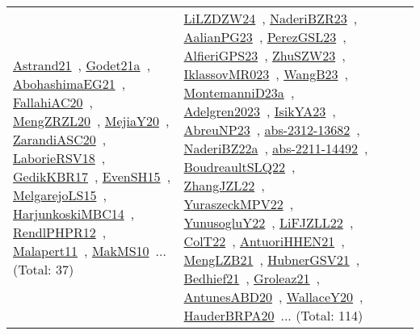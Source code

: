 {\begin{longtable}{lp{3cm}>{\raggedright\arraybackslash}p{6cm}>{\raggedright\arraybackslash}p{6cm}>{\raggedright\arraybackslash}p{8cm}}
\href{../works/Astrand21.pdf}{Astrand21}~\cite{Astrand21}, \href{../works/Godet21a.pdf}{Godet21a}~\cite{Godet21a}, \href{../works/AbohashimaEG21.pdf}{AbohashimaEG21}~\cite{AbohashimaEG21}, \href{../works/FallahiAC20.pdf}{FallahiAC20}~\cite{FallahiAC20}, \href{../works/MengZRZL20.pdf}{MengZRZL20}~\cite{MengZRZL20}, \href{../works/MejiaY20.pdf}{MejiaY20}~\cite{MejiaY20}, \href{../works/ZarandiASC20.pdf}{ZarandiASC20}~\cite{ZarandiASC20}, \href{../works/LaborieRSV18.pdf}{LaborieRSV18}~\cite{LaborieRSV18}, \href{../works/GedikKBR17.pdf}{GedikKBR17}~\cite{GedikKBR17}, \href{../works/EvenSH15.pdf}{EvenSH15}~\cite{EvenSH15}, \href{../works/MelgarejoLS15.pdf}{MelgarejoLS15}~\cite{MelgarejoLS15}, \href{../works/HarjunkoskiMBC14.pdf}{HarjunkoskiMBC14}~\cite{HarjunkoskiMBC14}, \href{../works/RendlPHPR12.pdf}{RendlPHPR12}~\cite{RendlPHPR12}, \href{../works/Malapert11.pdf}{Malapert11}~\cite{Malapert11}, \href{../works/MakMS10.pdf}{MakMS10}~\cite{MakMS10}... (Total: 37) & \href{../works/LiLZDZW24.pdf}{LiLZDZW24}~\cite{LiLZDZW24}, \href{../works/NaderiBZR23.pdf}{NaderiBZR23}~\cite{NaderiBZR23}, \href{../works/AalianPG23.pdf}{AalianPG23}~\cite{AalianPG23}, \href{../works/PerezGSL23.pdf}{PerezGSL23}~\cite{PerezGSL23}, \href{../works/AlfieriGPS23.pdf}{AlfieriGPS23}~\cite{AlfieriGPS23}, \href{../works/ZhuSZW23.pdf}{ZhuSZW23}~\cite{ZhuSZW23}, \href{../works/IklassovMR023.pdf}{IklassovMR023}~\cite{IklassovMR023}, \href{../works/WangB23.pdf}{WangB23}~\cite{WangB23}, \href{../works/MontemanniD23a.pdf}{MontemanniD23a}~\cite{MontemanniD23a}, \href{../works/Adelgren2023.pdf}{Adelgren2023}~\cite{Adelgren2023}, \href{../works/IsikYA23.pdf}{IsikYA23}~\cite{IsikYA23}, \href{../works/AbreuNP23.pdf}{AbreuNP23}~\cite{AbreuNP23}, \href{../works/abs-2312-13682.pdf}{abs-2312-13682}~\cite{abs-2312-13682}, \href{../works/NaderiBZ22a.pdf}{NaderiBZ22a}~\cite{NaderiBZ22a}, \href{../works/abs-2211-14492.pdf}{abs-2211-14492}~\cite{abs-2211-14492}, \href{../works/BoudreaultSLQ22.pdf}{BoudreaultSLQ22}~\cite{BoudreaultSLQ22}, \href{../works/ZhangJZL22.pdf}{ZhangJZL22}~\cite{ZhangJZL22}, \href{../works/YuraszeckMPV22.pdf}{YuraszeckMPV22}~\cite{YuraszeckMPV22}, \href{../works/YunusogluY22.pdf}{YunusogluY22}~\cite{YunusogluY22}, \href{../works/LiFJZLL22.pdf}{LiFJZLL22}~\cite{LiFJZLL22}, \href{../works/ColT22.pdf}{ColT22}~\cite{ColT22}, \href{../works/AntuoriHHEN21.pdf}{AntuoriHHEN21}~\cite{AntuoriHHEN21}, \href{../works/MengLZB21.pdf}{MengLZB21}~\cite{MengLZB21}, \href{../works/HubnerGSV21.pdf}{HubnerGSV21}~\cite{HubnerGSV21}, \href{../works/Bedhief21.pdf}{Bedhief21}~\cite{Bedhief21}, \href{../works/Groleaz21.pdf}{Groleaz21}~\cite{Groleaz21}, \href{../works/AntunesABD20.pdf}{AntunesABD20}~\cite{AntunesABD20}, \href{../works/WallaceY20.pdf}{WallaceY20}~\cite{WallaceY20}, \href{../works/HauderBRPA20.pdf}{HauderBRPA20}~\cite{HauderBRPA20}... (Total: 114)\\

\end{longtable}}
